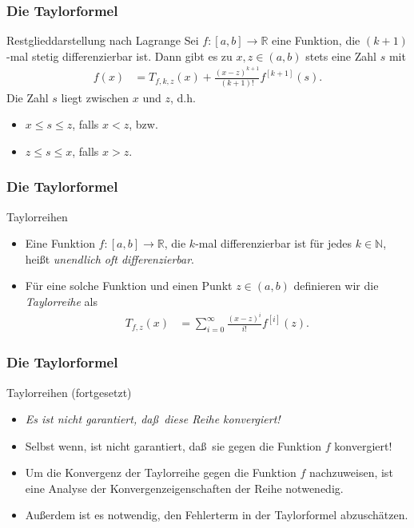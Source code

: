 \documentclass{beamer}
\renewcommand{\emph}[1]{{\textcolor{solarizedRed}{\itshape #1}}}
\newcommand\NN{\mathbb N}
\newcommand\RR{\mathbb R}
\renewcommand{\ae}{\"a}
\newcommand{\ue}{\"u}
\newcommand{\mytitle}{Die Taylorformel}
\begin{document}
\begin{frame}\frametitle{\mytitle}
	\begin{block}{Restglieddarstellung nach Lagrange}
		Sei $f:[a,b]\to\RR$ eine Funktion, die $(k+1)$-mal stetig differenzierbar ist.
		Dann gibt es zu $x,z\in(a,b)$ stets eine Zahl $s$ mit
		\begin{align*}
			f(x)&=T_{f,k,z}(x)+\frac{(x-z)^{k+1}}{(k+1)!}f^{[k+1]}(s).
		\end{align*}
		Die Zahl $s$ liegt zwischen $x$ und $z$, d.h.
		\begin{itemize}
			\item $x\leq s\leq z$, falls $x< z$, bzw.
			\item $z\leq s\leq x$, falls $x> z$.
		\end{itemize}
	\end{block}
\end{frame}

\begin{frame}\frametitle{\mytitle}
	\begin{block}{Taylorreihen}
	\begin{itemize}
		\item Eine Funktion $f:[a,b]\to\RR$, die $k$-mal differenzierbar ist f\ue r jedes $k\in\NN$, hei\ss t \emph{unendlich oft differenzierbar}.
		\item F\ue r eine solche Funktion und einen Punkt $z\in(a,b)$ definieren wir die \emph{Taylorreihe} als
			\begin{align*}
				T_{f,z}(x)&=\sum_{i=0}^\infty\frac{(x-z)^i}{i!}f^{[i]}(z).
			\end{align*}
	\end{itemize}
	\end{block}
\end{frame}

\begin{frame}\frametitle{\mytitle}
	\begin{block}{Taylorreihen (fortgesetzt)}
	\begin{itemize}
		\item \itshape Es ist nicht garantiert, da\ss\ diese Reihe konvergiert!
		\item Selbst wenn, ist nicht garantiert, da\ss\ sie gegen die Funktion $f$ konvergiert!
		\item Um die Konvergenz der Taylorreihe gegen die Funktion $f$ nachzuweisen, ist eine Analyse der Konvergenzeigenschaften der Reihe notwenedig.
		\item Au\ss erdem ist es notwendig, den Fehlerterm in der Taylorformel abzusch\ae tzen.
	\end{itemize}
	\end{block}
\end{frame}
\end{document}
